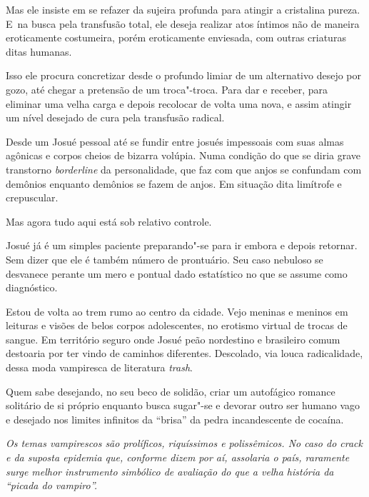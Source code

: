 Mas ele insiste em se refazer da sujeira profunda para atingir a
cristalina pureza. E~na busca pela transfusão total, ele deseja realizar
atos íntimos não de maneira eroticamente costumeira, porém eroticamente
enviesada, com outras criaturas ditas humanas.

Isso ele procura concretizar desde o profundo limiar de um alternativo
desejo por gozo, até chegar a pretensão de um troca"-troca. Para dar e
receber, para eliminar uma velha carga e depois recolocar de volta uma
nova, e assim atingir um nível desejado de cura pela transfusão radical.

Desde um Josué pessoal até se fundir entre josués impessoais com suas
almas agônicas e corpos cheios de bizarra volúpia. Numa condição do que
se diria grave transtorno \emph{borderline} da personalidade, que faz
com que anjos se confundam com demônios enquanto demônios se fazem de
anjos. Em situação dita limítrofe e crepuscular.

\asterisc{}

Mas agora tudo aqui está sob relativo controle.

Josué já é um simples paciente preparando"-se para ir embora e depois
retornar. Sem dizer que ele é também número de prontuário. Seu caso
nebuloso se desvanece perante um mero e pontual dado estatístico no que
se assume como diagnóstico.

\asterisc{}

Estou de volta ao trem rumo ao centro da cidade. Vejo meninas e meninos
em leituras e visões de belos corpos adolescentes, no erotismo virtual
de trocas de sangue. Em território seguro onde Josué peão nordestino e
brasileiro comum destoaria por ter vindo de caminhos diferentes.
Descolado, via louca radicalidade, dessa moda vampiresca de literatura
\emph{trash}.

Quem sabe desejando, no seu beco de solidão, criar um autofágico romance
solitário de si próprio enquanto busca sugar"-se e devorar outro ser
humano vago e desejado nos limites infinitos da ``brisa'' da pedra
incandescente de cocaína.

\begin{center}\asterisc{}\end{center}

\emph{Os temas vampirescos são prolíficos, riquíssimos e polissêmicos.
No caso do crack e da suposta epidemia que, conforme dizem por aí,
assolaria o país, raramente surge melhor instrumento simbólico de
avaliação do que a velha história da ``picada do vampiro''.}

